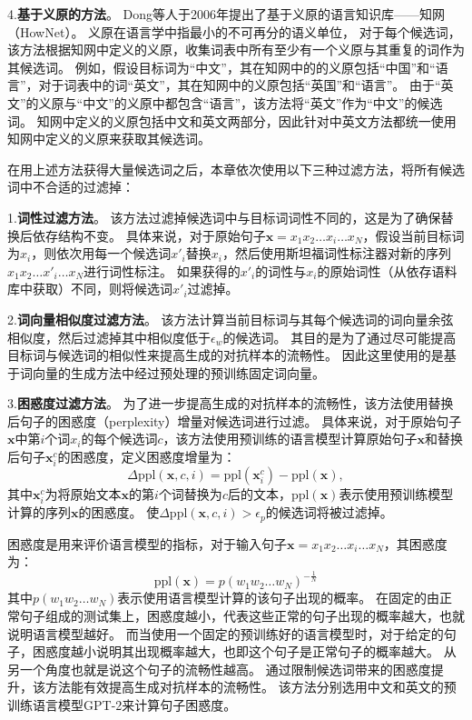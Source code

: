 4.\textbf{基于义原的方法}\cite{zang-etal-2020-word}。
Dong等人\cite{dong-etal-2006-hownet}于2006年提出了基于义原的语言知识库——知网（HowNet）。
义原在语言学中指最小的不可再分的语义单位， 对于每个候选词，该方法根据知网中定义的义原，收集词表中所有至少有一个义原与其重复的词作为其候选词。
例如，假设目标词为“中文”，其在知网中的的义原包括“中国”和“语言”，对于词表中的词“英文”，其在知网中的义原包括“英国”和“语言”。
由于“英文”的义原与“中文”的义原中都包含“语言”，该方法将“英文”作为“中文”的候选词。
知网中定义的义原包括中文和英文两部分，因此针对中英文方法都统一使用知网中定义的义原来获取其候选词。

在用上述方法获得大量候选词之后，本章依次使用以下三种过滤方法，将所有候选词中不合适的过滤掉：

1.\textbf{词性过滤方法}。
该方法过滤掉候选词中与目标词词性不同的，这是为了确保替换后依存结构不变。
具体来说，对于原始句子$\bm{x} = x_1x_2\dots x_i\dots x_N$，假设当前目标词为$x_i$，则依次用每一个候选词$x'_i$替换$x_i$，然后使用斯坦福词性标注器对新的序列$x_1x_2\dots x'_i\dots x_N$进行词性标注。
如果获得的$x'_i$的词性与$x_i$的原始词性（从依存语料库中获取）不同，则将候选词$x'_i$过滤掉。


2.\textbf{词向量相似度过滤方法}。
该方法计算当前目标词与其每个候选词的词向量余弦相似度，然后过滤掉其中相似度低于$\epsilon_w$的候选词。
其目的是为了通过尽可能提高目标词与候选词的相似性来提高生成的对抗样本的流畅性。
因此这里使用的是基于词向量的生成方法中经过预处理的预训练固定词向量。

3.\textbf{困惑度过滤方法}。
为了进一步提高生成的对抗样本的流畅性，该方法使用替换后句子的困惑度（perplexity）增量对候选词进行过滤。
具体来说，对于原始句子$\bm{x}$中第$i$个词$x_i$的每个候选词$c$，该方法使用预训练的语言模型计算原始句子$\bm{x}$和替换后句子$\bm{x}^c_{i}$的困惑度，定义困惑度增量为：
\begin{equation}
	\label{eq:ppl-inc}
	\Delta \text{ppl}(\bm{x},c,i)= \text{ppl}(\bm{x}^c_{i})-\text{ppl}(\bm{x}),
\end{equation}
其中$\bm{x}^c_{i}$为将原始文本$\bm{x}$的第$i$个词替换为$c$后的文本，$\text{ppl}(\bm{x})$表示使用预训练模型计算的序列$\bm{x}$的困惑度。
使$\Delta\text{ppl}(\bm{x},c,i) > \epsilon_p$的候选词将被过滤掉。

困惑度是用来评价语言模型的指标，对于输入句子$\bm{x} = x_1x_2\dots x_i\dots x_N$，其困惑度为：
\begin{equation}
    \text{ppl}(\bm{x}) = p(w_1w_2\dots w_N)^{-\frac{1}{N}}
\end{equation}
其中$p(w_1w_2\dots w_N)$表示使用语言模型计算的该句子出现的概率。
在固定的由正常句子组成的测试集上，困惑度越小，代表这些正常的句子出现的概率越大，也就说明语言模型越好。
而当使用一个固定的预训练好的语言模型时，对于给定的句子，困惑度越小说明其出现概率越大，也即这个句子是正常句子的概率越大。
从另一个角度也就是说这个句子的流畅性越高。
通过限制候选词带来的困惑度提升，该方法能有效提高生成对抗样本的流畅性。
该方法分别选用中文和英文的预训练语言模型GPT-2\cite{radford-etal-2019-language}来计算句子困惑度。

